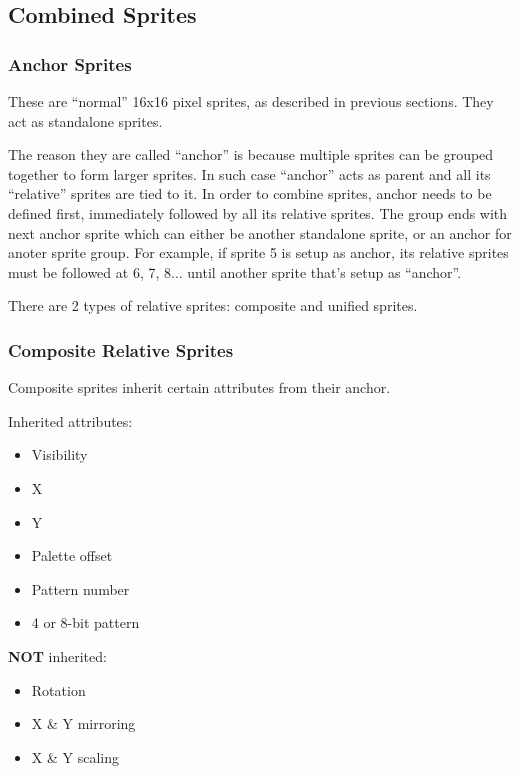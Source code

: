 \documentclass[12pt,twoside,openright,a4paper]{book}
\begin{document}
\pagebreak
\subsection{Combined Sprites}

\subsubsection{Anchor Sprites}

These are ``normal'' 16x16 pixel sprites, as described in previous sections. They act as standalone sprites.

The reason they are called ``anchor'' is because multiple sprites can be grouped together to form larger sprites. In such case ``anchor'' acts as parent and all its ``relative'' sprites are tied to it. In order to combine sprites, anchor needs to be defined first, immediately followed by all its relative sprites. The group ends with next anchor sprite which can either be another standalone sprite, or an anchor for anoter sprite group. For example, if sprite 5 is setup as anchor, its relative sprites must be followed at 6, 7, 8... until another sprite that's setup as ``anchor''.

There are 2 types of relative sprites: composite and unified sprites.

\subsubsection{Composite Relative Sprites}

Composite sprites inherit certain attributes from their anchor.

\begin{multicols}{2}
	 Inherited attributes:

	\begin{itemize}[topsep=1pt,itemsep=1pt]
		\item Visibility
		\item X
		\item Y
		\item Palette offset
		\item Pattern number
		\item 4 or 8-bit pattern 
	\end{itemize}

	\columnbreak

	\textbf{NOT} inherited:

	\begin{itemize}[topsep=1pt,itemsep=1pt]
		\item Rotation
		\item X \& Y mirroring
		\item X \& Y scaling
	\end{itemize}

\end{multicols}
\end{document}
